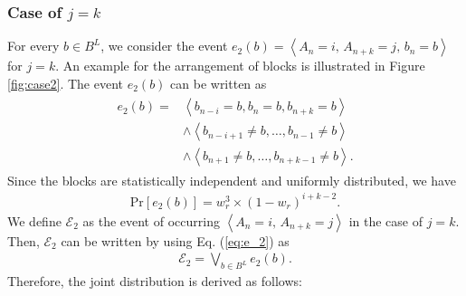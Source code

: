 \documentclass[dvipdfmx,english]{ampmt} %
\begin{document}
\subsubsection{Case of $j=k$}
For every $b \in B^{L}$, we consider the event $e_2(b)=\left< A_n=i ,\, A_{n+k}=j,\,b_n=b\right>$ for $j=k$. 
An example for the arrangement of blocks is illustrated in Figure \ref{fig:case2}.
The event $e_2(b)$ can be written as
\begin{align}\label{eq:e_2}
\begin{split}
  e_2(b) 
    = &\left< b_{n-i} = b , b_{n} = b, b_{n+k} = b \right> \\
    &\land \left< b_{n-i+1} \neq b , \dots , b_{n-1} \neq b \right> \\
    &\land \left< b_{n+1} \neq b , \dots , b_{n+k-1} \neq b \right>.
\end{split}
\end{align}
Since the blocks are statistically independent and uniformly distributed, we have
\begin{align}\label{eq:probability_e_2}
  \mathrm{Pr} \left[ e_2(b) \right] 
  =w_r^3 \times (1-w_{r})^{i+k-2}.
\end{align}
%
We define $\mathcal{E}_2$ as the event of occurring $\left< A_n=i ,\, A_{n+k}=j\right>$ in the case of $j=k$. Then, $\mathcal{E}_2$ can be written by using Eq. (\ref{eq:e_2}) as
\begin{align}\label{eq:E_2}
  \mathcal{E}_2 = \bigvee_{b\in B^L} e_2(b).
\end{align}
%
Therefore, the joint distribution is derived as follows:
\end{document}
